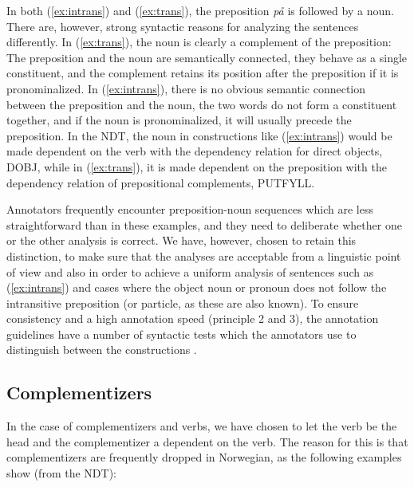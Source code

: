 \documentclass[10pt,a4paper]{article}
\begin{document}
In both (\ref{ex:intrans}) and (\ref{ex:trans}), the preposition \emph{på} is followed by a noun. There are, however, strong syntactic reasons for analyzing the sentences differently. In (\ref{ex:trans}), the noun is clearly a complement of the preposition: The preposition and the noun are semantically connected, they behave as a single constituent, and the complement retains its position after the preposition if it is pronominalized. In (\ref{ex:intrans}), there is no obvious semantic connection between the preposition and the noun, the two words do not form a constituent together, and if the noun is pronominalized, it will usually precede the preposition. In the NDT, the noun in constructions like (\ref{ex:intrans}) would be made dependent on the verb with the dependency relation for direct objects, DOBJ, while in (\ref{ex:trans}), it is made dependent on the preposition with the dependency relation of prepositional complements, PUTFYLL.

Annotators frequently encounter preposition-noun sequences which are less straightforward than in these examples, and they need to deliberate whether one or the other analysis is correct. We have, however, chosen to retain this distinction, to make sure that the analyses are acceptable from a linguistic point of view and also in order to achieve a uniform analysis of sentences such as (\ref{ex:intrans}) and cases where the object noun or pronoun does not follow the intransitive preposition (or particle, as these are also known). To ensure consistency and a high annotation speed (principle 2 and 3), the annotation guidelines have a number of syntactic tests which the annotators use to distinguish between the constructions \cite[54-56]{Kin:Sol:Eri:2013}.

\subsection{Complementizers}
In the case of complementizers and verbs, we have chosen to let the verb be the head and the complementizer a dependent on the verb. The reason for this is that
complementizers are frequently dropped in Norwegian, as the following examples show (from the NDT):
\end{document}
